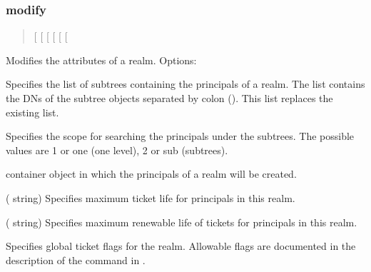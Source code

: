 \documentclass[letterpaper,10pt,english]{sphinxmanual}
\begin{document}
\subsubsection{modify}
\label{\detokenize{admin/admin_commands/kdb5_ldap_util:modify}}\label{\detokenize{admin/admin_commands/kdb5_ldap_util:kdb5-ldap-util-create-end}}\label{\detokenize{admin/admin_commands/kdb5_ldap_util:kdb5-ldap-util-modify}}\begin{quote}

\sphinxAtStartPar
{}
{[} \sphinxstyleemphasis{subtree\_dn\_list}{]}
{[} \sphinxstyleemphasis{search\_scope}{]}
{[} \sphinxstyleemphasis{container\_reference\_dn}{]}
{[} \sphinxstyleemphasis{max\_ticket\_life}{]}
{[} \sphinxstyleemphasis{max\_renewable\_ticket\_life}{]}
{[}\sphinxstyleemphasis{ticket\_flags}{]}
\end{quote}

\sphinxAtStartPar
Modifies the attributes of a realm.  Options:
\begin{description}
\sphinxAtStartPar
Specifies the list of subtrees containing the principals of a
realm.  The list contains the DNs of the subtree objects separated
by colon (\sphinxcode{\sphinxupquote{:}}).  This list replaces the existing list.

\sphinxAtStartPar
Specifies the scope for searching the principals under the
subtrees.  The possible values are 1 or one (one level), 2 or sub
(subtrees).

\sphinxAtStartPar
container object in which the principals of a realm will be
created.

\sphinxAtStartPar
( string) Specifies maximum ticket life for
principals in this realm.

\sphinxAtStartPar
( string) Specifies maximum renewable life of
tickets for principals in this realm.

\sphinxAtStartPar
Specifies global ticket flags for the realm.  Allowable flags are
documented in the description of the  command in
{\hyperref[\detokenize{admin/admin_commands/kadmin_local:kadmin-1}]{}}.

\end{description}
\end{document}
